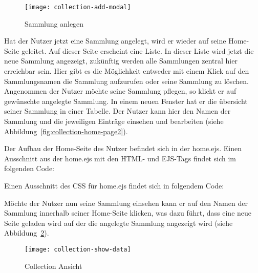 \begin{figure}[h]
    \centering
    \texttt{[image: collection-add-modal]}
    \caption{Sammlung anlegen}
    \label{fig:collection-add-modal}
\end{figure}

Hat der Nutzer jetzt eine Sammlung angelegt, wird er wieder auf seine Home-Seite geleitet.
Auf dieser Seite erscheint eine Liste.
In dieser Liste wird jetzt die neue Sammlung angezeigt, zukünftig werden alle Sammlungen zentral hier erreichbar sein.
Hier gibt es die Möglichkeit entweder mit einem Klick auf den Sammlungsnamen die Sammlung aufzurufen oder seine Sammlung zu löschen.
Angenommen der Nutzer möchte seine Sammlung pflegen, so klickt er auf gewünschte angelegte Sammlung.
In einem neuen Fenster hat er die übersicht seiner Sammlung in einer Tabelle.
Der Nutzer kann hier den Namen der Sammlung und die jeweiligen Einträge einsehen und bearbeiten (siehe Abbildung~\ref{fig:collection-home-page2}).


Der Aufbau der Home-Seite des Nutzer befindet sich in der home.ejs.
Einen Ausschnitt aus der home.ejs mit den HTML- und EJS-Tags findet sich im folgenden Code:

\vspace{1em}

\vspace{1em}

Einen Ausschnitt des CSS für home.ejs findet sich in folgendem Code:

\vspace{1em}

\vspace{1em}

Möchte der Nutzer nun seine Sammlung einsehen kann er auf den Namen der Sammlung innerhalb seiner Home-Seite klicken, was dazu führt, dass eine neue Seite geladen wird auf der die angelegte Sammlung angezeigt wird (siehe Abbildung~\ref{fig:collection-show-data}).

\begin{figure}[h]
    \centering
    \texttt{[image: collection-show-data]}
    \caption{Collection Ansicht}
    \label{fig:collection-show-data}
\end{figure}

